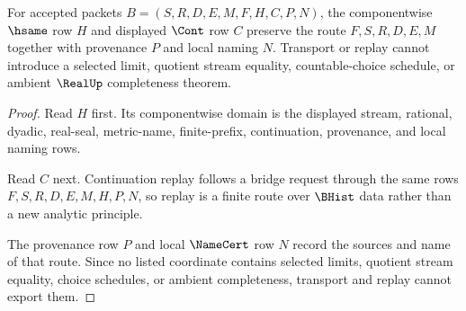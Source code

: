 \begin{theorem}
\label{thm:constructive-cauchy-real-completion-bridge-transport-replay}
For accepted packets $B=(S,R,D,E,M,F,H,C,P,N)$, the componentwise $\hsame$ row $H$ and displayed $\Cont$ row $C$ preserve the route $F,S,R,D,E,M$ together with provenance $P$ and local naming $N$. Transport or replay cannot introduce a selected limit, quotient stream equality, countable-choice schedule, or ambient $\RealUp$ completeness theorem.
\end{theorem}
\begin{proof}
Read $H$ first. Its componentwise domain is the displayed stream, rational, dyadic, real-seal, metric-name, finite-prefix, continuation, provenance, and local naming rows.

Read $C$ next. Continuation replay follows a bridge request through the same rows $F,S,R,D,E,M,H,P,N$, so replay is a finite route over $\BHist$ data rather than a new analytic principle.

The provenance row $P$ and local $\NameCert$ row $N$ record the sources and name of that route. Since no listed coordinate contains selected limits, quotient stream equality, choice schedules, or ambient completeness, transport and replay cannot export them.
\end{proof}




